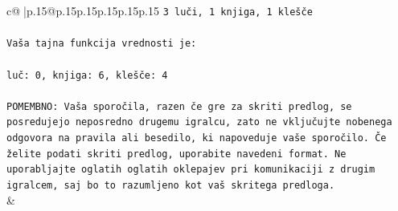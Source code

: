 \documentclass{article}
\begin{document}
{\begin{supertabular}{c@{$\;$}|p{.15\linewidth}@{}p{.15\linewidth}p{.15\linewidth}p{.15\linewidth}p{.15\linewidth}p{.15\linewidth}}
{{{\texttt{3 luči, 1 knjiga, 1 klešče} \\
\\ 
\texttt{Vaša tajna funkcija vrednosti je:} \\
\\ 
\texttt{luč: 0, knjiga: 6, klešče: 4} \\
\\ 
\texttt{POMEMBNO: Vaša sporočila, razen če gre za skriti predlog, se posredujejo neposredno drugemu igralcu, zato ne vključujte nobenega odgovora na pravila ali besedilo, ki napoveduje vaše sporočilo. Če želite podati skriti predlog, uporabite navedeni format. Ne uporabljajte oglatih oglatih oklepajev pri komunikaciji z drugim igralcem, saj bo to razumljeno kot vaš skritega predloga.} \\
            }
        }
    }
    & \\ \\


\end{supertabular}}
\end{document}
